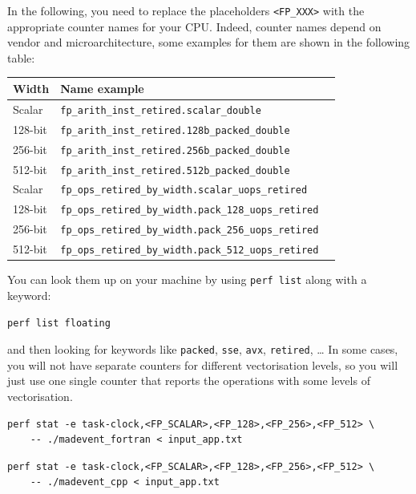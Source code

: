 \documentclass[11pt,a4paper]{article}
\begin{document}
In the following, you need to replace the placeholders \texttt{<FP\_XXX>} with the appropriate counter names for your CPU.
Indeed, counter names depend on vendor and microarchitecture, some examples for them are shown in the following table:
\begin{center}
\begin{tabular}{lll}
\toprule
    \textbf{Width} & \textbf{Name example} \\
\midrule
    Scalar  & \texttt{fp\_arith\_inst\_retired.scalar\_double} \\
    128-bit & \texttt{fp\_arith\_inst\_retired.128b\_packed\_double} \\
    256-bit & \texttt{fp\_arith\_inst\_retired.256b\_packed\_double} \\
    512-bit & \texttt{fp\_arith\_inst\_retired.512b\_packed\_double} \\
\midrule
    Scalar & \texttt{fp\_ops\_retired\_by\_width.scalar\_uops\_retired} \\
    128-bit & \texttt{fp\_ops\_retired\_by\_width.pack\_128\_uops\_retired} \\
    256-bit & \texttt{fp\_ops\_retired\_by\_width.pack\_256\_uops\_retired} \\
    512-bit & \texttt{fp\_ops\_retired\_by\_width.pack\_512\_uops\_retired} \\
\bottomrule
\end{tabular}
\end{center}

You can look them up on your machine by using \texttt{perf list} along with a keyword:
\begin{lstlisting}[style=bashstyle]
perf list floating
\end{lstlisting}
and then looking for keywords like \texttt{packed}, \texttt{sse}, \texttt{avx}, \texttt{retired}, \dots
In some cases, you will not have separate counters for different vectorisation levels, so you will just use one single counter that reports the operations with some levels of vectorisation.

\begin{lstlisting}[style=bashstyle]
perf stat -e task-clock,<FP_SCALAR>,<FP_128>,<FP_256>,<FP_512> \
    -- ./madevent_fortran < input_app.txt
\end{lstlisting}

\begin{lstlisting}[style=bashstyle]
perf stat -e task-clock,<FP_SCALAR>,<FP_128>,<FP_256>,<FP_512> \
    -- ./madevent_cpp < input_app.txt
\end{lstlisting}
\end{document}
